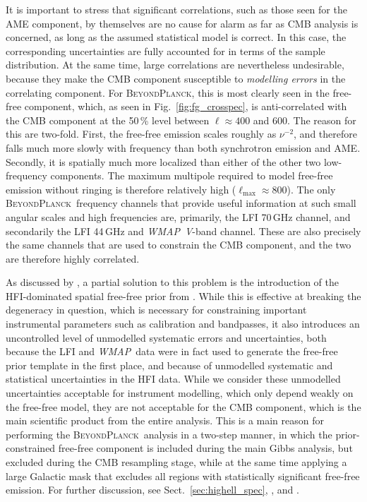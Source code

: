 \documentclass[twocolumn]{aa}
\def\WMAP{\textit{WMAP}}
\newcommand{\BP}{\textsc{BeyondPlanck}}
\begin{document}
It is important to stress that significant correlations, such as those
seen for the AME component, by themselves are no cause for alarm as
far as CMB analysis is concerned, as long as the assumed statistical
model is correct. In this case, the corresponding uncertainties are
fully accounted for in terms of the sample distribution. At the same
time, large correlations are nevertheless undesirable, because they
make the CMB component susceptible to \emph{modelling errors} in the
correlating component. For \BP, this is most clearly seen in the
free-free component, which, as seen in Fig.~\ref{fig:fg_crosspec}, is
anti-correlated with the CMB component at the 50\,\% level between
$\ell\approx400$ and 600. The reason for this are two-fold. First, the
free-free emission scales roughly as $\nu^{-2}$, and therefore falls
much more slowly with frequency than both synchrotron emission and
AME. Secondly, it is spatially much more localized than either of the
other two low-frequency components. The maximum multipole required to
model free-free emission without ringing is therefore relatively high
($\ell_{\mathrm{max}}\approx800$). The only \BP\ frequency channels
that provide useful information at such small angular scales and high
frequencies are, primarily, the LFI 70\,GHz channel, and secondarily
the LFI 44\,GHz and \WMAP\ \textit V-band channel. These are also precisely
the same channels that are used to constrain the CMB component, and
the two are therefore highly correlated.

As discussed by \citet{bp13}, a partial solution to this problem is
the introduction of the HFI-dominated spatial free-free prior from
\citet{planck2014-a12}. While this is effective at breaking the
degeneracy in question, which is necessary for constraining important
instrumental parameters such as calibration and bandpasses, it also
introduces an uncontrolled level of unmodelled systematic errors and
uncertainties, both because the LFI and \WMAP\ data were in fact used
to generate the free-free prior template in the first place, and
because of unmodelled systematic and statistical uncertainties in the
HFI data. While we consider these unmodelled uncertainties acceptable
for instrument modelling, which only depend weakly on the free-free
model, they are not acceptable for the CMB component, which is the
main scientific product from the entire analysis. This is a main
reason for performing the \BP\ analysis in a two-step manner, in which
the prior-constrained free-free component is included during the main
Gibbs analysis, but excluded during the CMB resampling stage, while at
the same time applying a large Galactic mask that excludes all regions
with statistically significant free-free emission. For further
discussion, see Sect.~\ref{sec:highell_spec}, \citet{bp12}, and
\citet{bp13}. 
\end{document}
